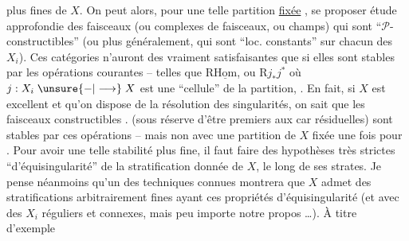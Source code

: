 plus fines de $X$. On peut alors, pour une telle partition \uline{fixée} , se proposer  étude approfondie  des faisceaux (ou complexes de faisceaux, ou champs) qui sont ``$\mathcal P$-constructibles'' (ou plus généralement, qui sont ``loc. constants'' sur chacun des $X_i$). Ces catégories n'auront des   vraiment satisfaisantes que si elles sont stables par les opérations courantes -- telles que $\mathrm R\underline{\mathrm{Hom}}$, ou $\mathrm Rj_*j^*$ où $j:X_i\mathrel{\unsure{-|\longrightarrow}}X$ est une ``cellule'' de la partition, . En fait, si $X$ est excellent et qu'on dispose de la résolution des singularités, on sait que les faisceaux  constructibles . (sous réserve d'être premiers aux car résiduelles) sont stables par  ces opérations -- mais non avec une partition de $X$ fixée une fois pour . Pour avoir une telle stabilité plus fine, il faut faire des hypothèses très strictes  ``d'équisingularité'' de la stratification donnée de $X$, le long de ses strates. Je pense néanmoins qu'un  des techniques connues montrera que $X$ admet des stratifications arbitrairement fines ayant ces propriétés d'équisingularité (et avec des $X_i$ réguliers et connexes, mais peu importe  notre propos \ldots). À titre d'exemple
